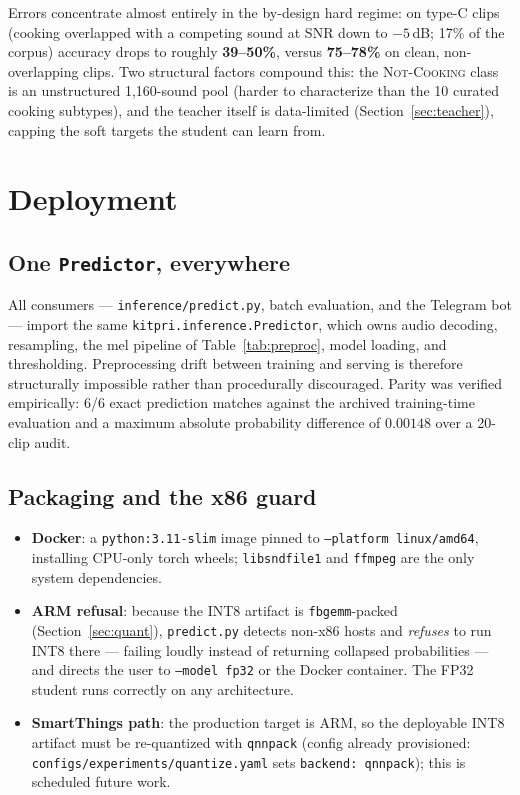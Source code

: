 \documentclass[11pt,a4paper]{article}
\newcommand{\notcooking}{\textsc{Not-Cooking}}
\begin{document}
Errors concentrate almost entirely in the by-design hard regime: on type-C
clips (cooking overlapped with a competing sound at SNR down to $-5$\,dB;
17\% of the corpus) accuracy drops to roughly \textbf{39--50\%}, versus
\textbf{75--78\%} on clean, non-overlapping clips. Two structural factors
compound this: the \notcooking{} class is an unstructured 1{,}160-sound pool
(harder to characterize than the 10 curated cooking subtypes), and the
teacher itself is data-limited (Section~\ref{sec:teacher}), capping the soft
targets the student can learn from.

\section{Deployment}\label{sec:deploy}

\subsection{One \texttt{Predictor}, everywhere}\label{sec:parity}

All consumers --- \texttt{inference/predict.py}, batch evaluation, and the
Telegram bot --- import the same \texttt{kitpri.inference.Predictor}, which
owns audio decoding, resampling, the mel pipeline of
Table~\ref{tab:preproc}, model loading, and thresholding. Preprocessing drift
between training and serving is therefore structurally impossible rather than
procedurally discouraged. Parity was verified empirically: 6/6 exact
prediction matches against the archived training-time evaluation and a
maximum absolute probability difference of $0.00148$ over a 20-clip audit.

\subsection{Packaging and the x86 guard}\label{sec:packaging}

\begin{itemize}[itemsep=2pt,topsep=3pt]
  \item \textbf{Docker}: a \texttt{python:3.11-slim} image pinned to
        \texttt{--platform linux/amd64}, installing CPU-only torch wheels;
        \texttt{libsndfile1} and \texttt{ffmpeg} are the only system
        dependencies.
  \item \textbf{ARM refusal}: because the INT8 artifact is
        \texttt{fbgemm}-packed (Section~\ref{sec:quant}),
        \texttt{predict.py} detects non-x86 hosts and \emph{refuses} to run
        INT8 there --- failing loudly instead of returning collapsed
        probabilities --- and directs the user to \texttt{--model fp32} or
        the Docker container. The FP32 student runs correctly on any
        architecture.
  \item \textbf{SmartThings path}: the production target is ARM, so the
        deployable INT8 artifact must be re-quantized with
        \texttt{qnnpack} (config already provisioned:
        \texttt{configs/experiments/quantize.yaml} sets
        \texttt{backend: qnnpack}); this is scheduled future work.
\end{itemize}
\end{document}
